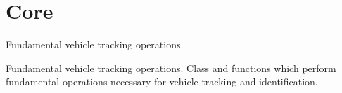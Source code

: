 \hypertarget{group___core}{
\section{\-Core}
\label{group___core}
}


\-Fundamental vehicle tracking operations.  


\-Fundamental vehicle tracking operations. \-Class and functions which perform fundamental operations necessary for vehicle tracking and identification. 